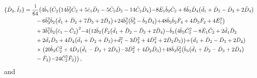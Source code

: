 \documentclass[10pt]{amsart}
\theoremstyle{definition}
\theoremstyle{corollary}
\theoremstyle{remark}
\theoremstyle{conclusion}
\begin{document}
\begin{align}
\{\bar{D}_3, \bar{I}_2\}&=\frac{\rm i}{64}  \bigl(4 \bar{b}_1 \bigl(\bar{C}_2 \bigl(14 \bar{b}_3^2 \bar{C}_2+5 \bar{c}_1 \bar{D}_2-5 \bar{C}_2 \bar{D}_2-14 \bar{C}_2 \bar{D}_4\bigl)-8 \bar{E}_1 \bar{b}_3 \bar{C}_2+6 \bar{b}_2 \bar{D}_4 \bigl(\bar{d}_1+\bar{D}_2-\bar{D}_3+2 \bar{D}_4\bigl) \nonumber \\
& \hskip 0.7 cm-6 \bar{b}_3^2 \bar{b}_2 \bigl(\bar{d}_1+\bar{D}_2+7 \bar{D}_3+2 \bar{D}_4\bigl)+24 \bar{b}_2^2 \bigl(\bar{b}_3^3-\bar{b}_3 \bar{D}_4\bigl)+48 \bar{b}_3 \bar{b}_2 \bar{F}_4+4 \bar{D}_3 \bar{F}_2+4 \bar{E}_1^2\bigl) \nonumber \\
& \hskip 0.7 cm+3 \bar{b}_1^2 \bar{b}_2 \bigl(\bar{c}_1-\bar{C}_2\bigl)^2-4 \bigl(12 \bar{b}_2 \bigl(\bar{F}_2 \bigl(\bar{d}_1+\bar{D}_2-\bar{D}_3+2 \bar{D}_4\bigl)-\bar{b}_3 \bigl(4 \bar{b}_3 \bar{C}_2^2-8 \bar{E}_1 \bar{C}_2+2 \bar{d}_1 \bar{D}_2  \nonumber \\
& \hskip 0.7 cm+2 \bar{d}_1 \bar{D}_3+4 \bar{D}_4 \bigl(\bar{d}_1+\bar{D}_2+\bar{D}_3\bigl)+\bar{d}_1^2-3 \bar{D}_3^2+4 \bar{D}_4^2+2 \bar{D}_2 \bar{D}_3\bigl)\bigl)+\bigl(\bar{d}_1+\bar{D}_2-\bar{D}_3+2 \bar{D}_4\bigl)  \nonumber \\
& \hskip 0.7 cm \times	\bigl(20 \bar{b}_3 \bar{C}_2^2+4 \bar{D}_3 \bigl(\bar{d}_1-\bar{D}_3+2 \bar{D}_4\bigl)-3 \bar{D}_2^2+4 \bar{D}_2 \bar{D}_3\bigl)+48 \bar{b}_3 \bar{b}_2^2 \bigl(\bar{b}_3 \bigl(\bar{d}_1+\bar{D}_2-\bar{D}_3+2 \bar{D}_4\bigl)  \nonumber \\
& \hskip 0.7 cm-\bar{F}_2\bigl)-24 \bar{C}_2^2 \bar{F}_2\bigl)\bigl) \,  ,  \end{align} and
\end{document}
